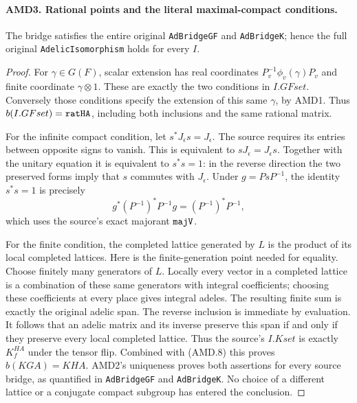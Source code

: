\documentclass[11pt,a4paper]{article}
\numberwithin{equation}{section}
\theoremstyle{remark}\newtheorem{remark}[theorem]{Remark}
\begin{document}
\paragraph{AMD3. Rational points and the literal maximal-compact conditions.}
\label{claim:AMD3}
The bridge satisfies the entire original \texttt{Ad\allowbreak Bridge\allowbreak GF} and
\texttt{Ad\allowbreak Bridge\allowbreak K}; hence the full original
\texttt{Adelic\allowbreak Isomorphism} holds for every \(I\).

\begin{proof}
For \(\gamma\in G(F)\), scalar extension has real coordinates
\(P_v^{-1}\phi_v(\gamma)P_v\) and finite coordinate
\(\gamma\otimes1\).  These are exactly the two conditions in
\(I.GFset\).  Conversely those conditions specify the extension
of this same \(\gamma\), by AMD1.  Thus
\(b(I.GFset)=\texttt{rat\allowbreak HA}\), including both inclusions and
the same rational matrix.

For the infinite compact condition, let \(s^*J_\epsilon s=J_\epsilon\).
The source requires its entries between opposite signs to vanish.
This is equivalent to \(sJ_\epsilon=J_\epsilon s\).  Together
with the unitary equation it is equivalent to \(s^*s=1\): in
the reverse direction the two preserved forms imply that \(s\)
commutes with \(J_\epsilon\).  Under \(g=PsP^{-1}\), the
identity \(s^*s=1\) is precisely
\[
 g^*(P^{-1})^*P^{-1}g=(P^{-1})^*P^{-1},
 \tag{AMD.8}
\]
which uses the source's exact majorant \(\texttt{maj\allowbreak V}\).

For the finite condition, the completed lattice generated by
\(L\) is the product of its local completed lattices.  Here is
the finite-generation point needed for equality.  Choose finitely
many generators of \(L\).  Locally every vector in a completed
lattice is a combination of these same generators with integral
coefficients; choosing these coefficients at every place gives
integral adeles.  The resulting finite sum is exactly the original
adelic span.  The reverse inclusion is immediate by evaluation.
It follows that an adelic matrix and its inverse preserve this
span if and only if they preserve every local completed lattice.
Thus the source's \(I.Kset\) is exactly \(K_f^{HA}\) under
the tensor flip.  Combined with (AMD.8) this proves
\(b(KGA)=KHA\).  AMD2's uniqueness proves both assertions for
every source bridge, as quantified in \texttt{Ad\allowbreak Bridge\allowbreak GF} and
\texttt{Ad\allowbreak Bridge\allowbreak K}.  No choice of a different lattice or a
conjugate compact subgroup has entered the conclusion.
\end{proof}
\end{document}
